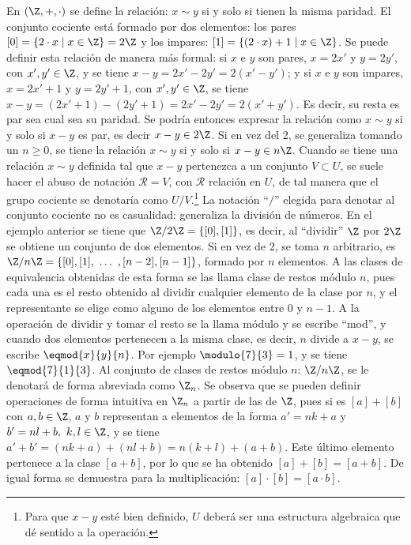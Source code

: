 \begin{TFGampliado}
\begin{obs}
        \item En $(\Z, +, \cdot )$ se define la relación: $x \sim y$ si y solo si tienen la misma paridad. El conjunto cociente está formado por dos elementos: los pares $[0] =\{ 2 \cdot x\mid x\in\Z\} = 2\Z$ y los impares: $[1] = \{ (2 \cdot x) + 1\mid x\in\Z\}$. Se puede definir esta relación de manera más formal: si $x$ e $y$ son pares, $x = 2x'$ y $y = 2y'$, con $x',y' \in \Z$, y se tiene $x - y = 2x' - 2y' = 2 (x'-y')$; y si $x$ e $y$ son impares, $x = 2x' + 1$ y $y = 2y' + 1$, con $x',y' \in \Z$, se tiene $x - y = (2x'+ 1) - (2y'+1) = 2x'- 2y' = 2(x'+y')$. Es decir, su resta es par sea cual sea su paridad. Se podría entonces expresar la relación como $x \sim y$ si y solo si $x - y$ es par, es decir $x - y \in 2\Z$. Si en vez del 2, se generaliza tomando un $n\geq 0$, se tiene la relación $x \sim y$ si y solo si $x - y \in n\Z$. Cuando se tiene una relación $x \sim y$ definida tal que $x - y$ pertenezca a un conjunto $V \subset U$, se suele hacer el abuso de notación $\mathcal{R} = V$, con $\mathcal{R}$ relación en $U$, de tal manera que el grupo cociente se denotaría como $U/V$.\footnote{Para que $x - y$ esté bien definido, $U$ deberá ser una estructura algebraica que dé sentido a la operación.} La notación ``$/$'' elegida para denotar al conjunto cociente no es casualidad: generaliza la división de números. En el ejemplo anterior se tiene que $\Z/2\Z = \{[0],[1]\}$, es decir, al ``dividir'' $\Z$ por $2\Z$ se obtiene un conjunto de dos elementos. Si en vez de 2, se toma $n$ arbitrario, es $\Z/n\Z = \{[0],[1], \ \ldots \ , [n-2], [n-1]\}$, formado por $n$ elementos. A las clases de equivalencia obtenidas de esta forma se las llama clase de restos módulo $n$, pues cada una es el resto obtenido al dividir cualquier elemento de la clase por $n$, y el representante se elige como alguno de los elementos entre $0$ y $n-1$. A la operación de dividir y tomar el resto se la llama módulo y se escribe ``mod'', y cuando dos elementos pertenecen a la misma clase, es decir, $n$ divide a $x-y$, se escribe $\eqmod{x}{y}{n}$. Por ejemplo $\modulo{7}{3} = 1$, y se tiene $\eqmod{7}{1}{3}$. Al conjunto de clases de restos módulo $n$: $\Z/n\Z$, se le denotará de forma abreviada como $\Z_n$. Se observa que se pueden definir operaciones de forma intuitiva en $\Z_n$ a partir de las de $\Z$, pues si es $[a] + [b]$ con $a,b \in \Z$, $a$ y $b$ representan a elementos de la forma $a' =nk + a$ y $b' =nl + b, \ k,l\in \Z$, y se tiene $a' + b' = (nk + a) + (nl + b) = n(k + l) + (a+b)$. Este último elemento pertenece a la clase $[a+b]$, por lo que se ha obtenido $[a] + [b] = [a+b]$. De igual forma se demuestra para la multiplicación: $[a] \cdot [b] = [a\cdot b]$.
    \end{obs}    
    

\end{TFGampliado}

